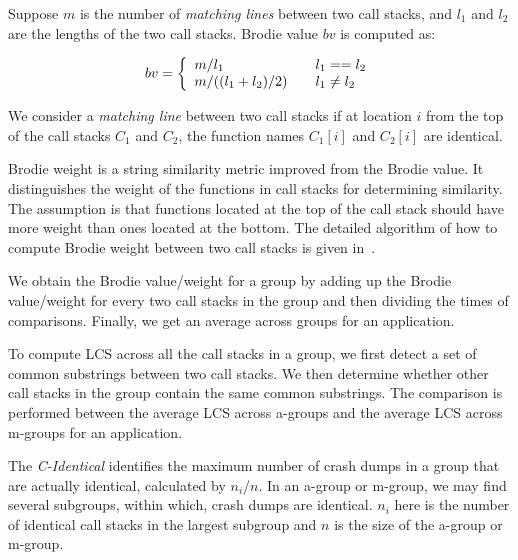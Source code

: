 Suppose $m$ is the number of {\it matching lines} between two call stacks, and $l_1$ and $l_2$ are the lengths of the two call stacks. Brodie value $bv$ is computed as:

\[
  bv = \left\{
  \begin{array}{l l}
    m/l_1 & \quad l_1 == l_2\\
    m/((l_1+l_2)/2) & \quad l_1\neq l_2\\
  \end{array} \right.
\]

We consider a {\it matching line} between two call stacks if at location $i$ from the top of the call stacks $C_1$ and $C_2$, the function names $C_1[i]$ and $C_2[i]$ are identical. 

Brodie weight is a string similarity metric improved from the Brodie value. It distinguishes the weight of the functions in call stacks for determining similarity. The assumption is that functions located at the top of the call stack should have more weight than ones located at the bottom. The detailed algorithm of how to compute Brodie weight between two call stacks is given in~\cite{brodie:automated}.



 	  

We obtain the Brodie value/weight for a group by adding up the Brodie value/weight for every two call stacks in the group and then dividing the times of comparisons. Finally, we get an average across groups for an application.

To compute LCS across all the call stacks in a group, we first detect a set of common substrings between two call stacks. We then determine whether other call stacks in the group contain the same common substrings. The comparison is performed between the average LCS across a-groups and the average LCS across m-groups for an application. 

The {\it C-Identical} identifies the maximum number of crash dumps in a group that are actually identical, calculated by $n_i$/$n$. In an a-group or m-group, we may find several subgroups, within which, crash dumps are identical. $n_i$ here is the number of identical call stacks in the largest subgroup and $n$ is the size of the a-group or m-group.